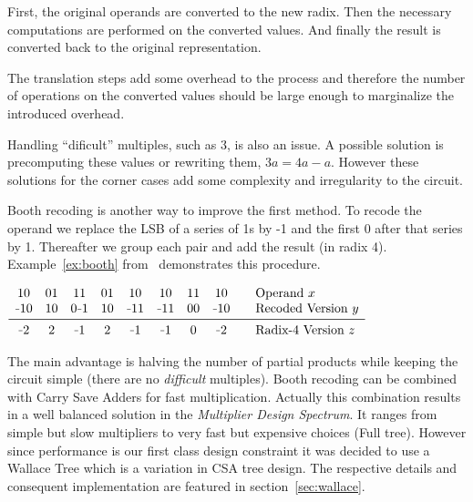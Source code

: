 First, the original operands are converted to the new radix. Then the necessary computations are performed on the converted values. And finally the result is converted back to the original representation.

The translation steps add some overhead to the process and therefore the number of operations on the converted values should be large enough to marginalize the introduced overhead.

Handling ``dificult'' multiples, such as 3, is also an issue. A possible solution is precomputing these values or rewriting them, \eg $3a = 4a - a$. However these solutions for the corner cases add some complexity and irregularity to the circuit.

Booth recoding is another way to improve the first method. To recode the operand we replace the LSB of a series of 1s by -1 and the first 0 after that series by 1. Thereafter we group each pair and add the result (in radix 4). Example~\ref{ex:booth} from~\cite{book} demonstrates this procedure.

\begin{center}
\captionsetup{type=table}
$\begin{array}{ccccccccl}
10  & 01 & 11  & 01 & 10 & 10 & 11 & 10 & \quad\text{Operand } x\\
\unaryminus10 & 10 & 0\unaryminus1 & 10 & \unaryminus11 & \unaryminus11 & 00 & \unaryminus10 &\quad \text{Recoded Version } y\\
\midrule
\unaryminus2 & 2 & \unaryminus1 & 2 & \unaryminus1 & \unaryminus1 & 0 & \unaryminus2 & \quad\text{Radix-4 Version } z\\ 
\end{array}$
\label{ex:booth}
\end{center}

The main advantage is halving the number of partial products while keeping the circuit simple (there are no \emph{difficult} multiples).
Booth recoding can be combined with Carry Save Adders for fast multiplication. Actually this combination results in a well balanced solution in the \emph{Multiplier Design Spectrum}. It ranges from simple but slow multipliers to very fast but expensive choices (\ie Full tree).
However since performance is our first class design constraint it was decided to use a Wallace Tree which is a variation in CSA tree design. The respective details and consequent implementation are featured in section~\ref{sec:wallace}.

